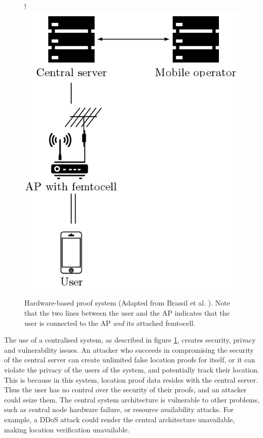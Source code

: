 \begin{figure}[H]
\begin{center}
 {!} {\includegraphics{diagrams/hp_paper.png}}
\caption[Hardware-based proof system]{Hardware-based proof system (Adapted from Brassil et al. \cite{brassil}). Note that the two lines between the user and the AP indicates that the user is connected to the AP \textit{and} its attached femtocell.}
\label{fig:hp_labs}
\end{center}
\end{figure}

The use of a centralised system, as described in figure \ref{fig:hp_labs}, creates security, privacy and vulnerability issues. An attacker who succeeds in compromising the security of the central server can create unlimited false location proofs for itself, or it can violate the privacy of the users of the system, and potentially track their location. This is because in this system, location proof data resides with the central server. Thus the user has no control over the security of their proofs, and an attacker could seize them. The central system architecture is vulnerable to other problems, such as central node hardware failure, or resource availability attacks. For example, a DDoS attack \cite{ddos} could render the central architecture unavailable, making location verification unavailable.
\\


